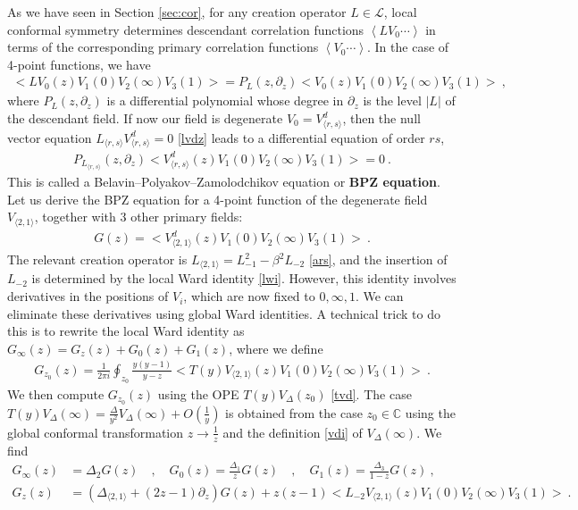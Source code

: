 \documentclass[12pt, a4paper]{article}
\newcommand{\myindex}[1]{\textbf{\boldmath #1}}
\theoremstyle{break}
\begin{document}
As we have seen in Section \ref{sec:cor}, for any creation operator $L\in\mathcal{L}$, local conformal symmetry determines descendant correlation functions $\left<LV_0\cdots \right>$ in terms of the corresponding primary correlation functions $\left<V_0\cdots \right>$.
In the case of 4-point functions, we have 
\begin{align}
 \Big<LV_0(z)V_1(0)V_2(\infty)V_3(1)\Big> = P_L(z,\partial_z) \Big<V_0(z)V_1(0)V_2(\infty)V_3(1)\Big>\ ,
\end{align}
where $P_L(z,\partial_z)$ is a differential polynomial whose degree in $\partial_z$ is the level $|L|$ of the descendant field. If now our field is degenerate $V_0= V^d_{\langle r,s\rangle}$, then the null vector equation $L_{\langle r,s\rangle}V^d_{\langle r,s\rangle}=0$ \eqref{lvdz} leads to a differential equation of order $rs$,
\begin{align}
 P_{L_{\langle r,s\rangle}}(z,\partial_z) \Big<V^d_{\langle r,s\rangle}(z)V_1(0)V_2(\infty)V_3(1)\Big> = 0\ .
\end{align}
This is called a Belavin--Polyakov--Zamolodchikov equation or \myindex{BPZ equation}.  
Let us derive the BPZ equation for a 4-point function  of the degenerate field $V_{\langle 2,1\rangle}$, together with 3 other primary fields:
\begin{align}
 G(z)=\Big<V_{\langle 2,1\rangle}^d(z)V_{1}(0)V_{2}(\infty)V_{3}(1)\Big>\ .
 \label{goz}
\end{align}
The relevant creation operator is $L_{\langle 2,1\rangle} = L_{-1}^2 -\beta^2L_{-2}$ \eqref{ars}, and the insertion of $L_{-2}$ is determined by the local Ward identity \eqref{lwi}. However, this identity involves derivatives in the positions of $V_{i}$, which are now fixed to $0,\infty,1$. We can eliminate these derivatives using global Ward identities. A technical trick to do this is to rewrite the local Ward identity as $G_\infty(z) = G_{z}(z) + G_0(z) + G_1(z)$, where we define
\begin{align}
 G_{z_0}(z) = \frac{1}{2\pi i} \oint_{z_0} \frac{y(y-1)}{y-z} \Big< T(y)V_{\langle 2,1\rangle}(z)V_{1}(0)V_{2}(\infty)V_{3}(1)\Big> \ .
\end{align}
We then compute $G_{z_0}(z)$ using the OPE $T(y)V_\Delta(z_0)$ \eqref{tvd}. The case $T(y)V_\Delta(\infty) = \frac{\Delta}{y^2} V_\Delta(\infty) + O(\frac{1}{y})$ is obtained from the case $z_0\in\mathbb{C}$ using the global conformal transformation $z\to \frac{1}{z}$ and the definition \eqref{vdi} of $V_\Delta(\infty)$. We find 
\begin{subequations}
\begin{align}
 G_\infty(z) &= \Delta_2 G(z) \quad , \quad G_0(z) = \frac{\Delta_1}{z}G(z)\quad , \quad G_1(z) = \frac{\Delta_3}{1-z}G(z)\ ,
 \\
 G_z(z) &= \left(\Delta_{\langle 2,1\rangle} + (2z-1)\partial_z\right) G(z) + z(z-1)\Big<L_{-2}V_{\langle 2,1\rangle}(z)V_{1}(0)V_{2}(\infty)V_{3}(1)\Big>
 \ .
\end{align}
\end{subequations}
\end{document}
